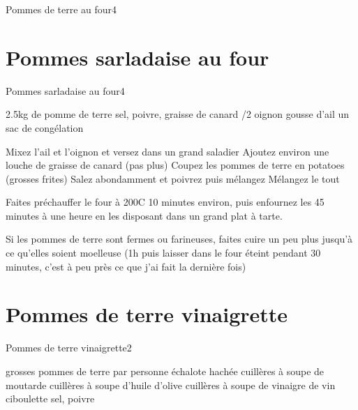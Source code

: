 {\begin{recette}{Pommes de terre au four}{4}{}{}
\begin{cuisson}
\end{cuisson}
\end{recette}


\section{Pommes sarladaise au four}
\begin{recette}{Pommes sarladaise au four}{4}{}{}
\begin{ingredients}
\ingredient 2.5kg de pomme de terre
\ingredient sel, poivre, graisse de canard
/2 oignon
 gousse d'ail
\ingredient un sac de congélation
\end{ingredients}

\begin{preparation}
\etape Mixez l'ail et l'oignon et versez dans un grand saladier
\etape Ajoutez environ une louche de graisse de canard (pas plus)
\etape Coupez les pommes de terre en potatoes (grosses frites)
\etape Salez abondamment et poivrez puis mélangez
\etape Mélangez le tout
\end{preparation}

\begin{cuisson}
Faites préchauffer le four à 200\degres C 10 minutes environ, puis enfournez les 45 minutes à une heure en les disposant dans un grand plat 
à tarte.

Si les pommes de terre sont fermes ou farineuses, faites cuire un peu plus jusqu'à ce qu'elles soient moelleuse (1h puis laisser dans le four éteint pendant 30 minutes, c'est à peu près ce que j'ai fait la dernière fois)
\end{cuisson}
\end{recette}

\section{Pommes de terre vinaigrette}
\begin{recette}{Pommes de terre vinaigrette}{2}{}{}
\begin{ingredients}
 grosses pommes de terre par personne
 échalote hachée
 cuillères à soupe de moutarde
 cuillères à soupe d'huile d'olive
 cuillères à soupe de vinaigre de vin
\ingredient ciboulette
\ingredient sel, poivre
\end{ingredients}


\end{recette}}
